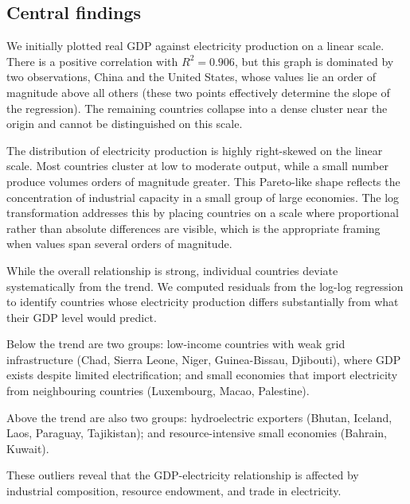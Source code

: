 \documentclass{article}
\begin{document}
	\subsection*{Central findings}
		\par{}
		We initially plotted real GDP against electricity production on a linear scale. There is a positive correlation with $R^2 = 0.906$, but this graph is dominated by two observations, China and the United States, whose values lie an order of magnitude above all others (these two points effectively determine the slope of the regression). The remaining countries collapse into a dense cluster near the origin and cannot be distinguished on this scale.
		\par{}
		The distribution of electricity production is highly right-skewed on the linear scale. Most countries cluster at low to moderate output, while a small number produce volumes orders of magnitude greater. This Pareto-like shape reflects the concentration of industrial capacity in a small group of large economies. The log transformation addresses this by placing countries on a scale where proportional rather than absolute differences are visible, which is the appropriate framing when values span several orders of magnitude.
		\par{}
		While the overall relationship is strong, individual countries deviate systematically from the trend. We computed residuals from the log-log regression to identify countries whose electricity production differs substantially from what their GDP level would predict.
		\par{}
		Below the trend are two groups: low-income countries with weak grid infrastructure (Chad, Sierra Leone, Niger, Guinea-Bissau, Djibouti), where GDP exists despite limited electrification; and small economies that import electricity from neighbouring countries (Luxembourg, Macao, Palestine).
		\par{}
		Above the trend are also two groups: hydroelectric exporters (Bhutan, Iceland, Laos, Paraguay, Tajikistan); and resource-intensive small economies (Bahrain, Kuwait).
		\par{}
		These outliers reveal that the GDP-electricity relationship is affected by industrial composition, resource endowment, and trade in electricity.
\end{document}
